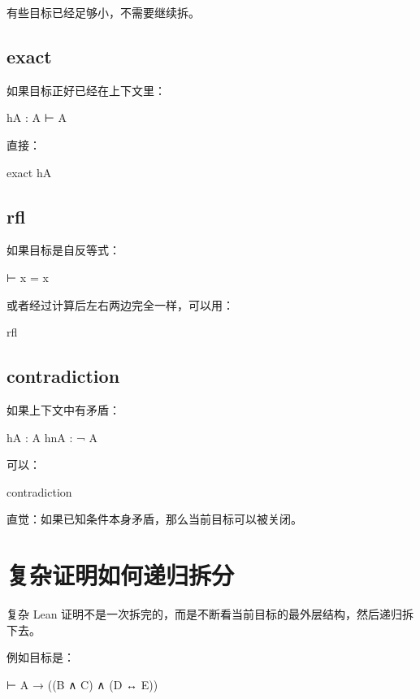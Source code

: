 \documentclass[UTF8,12pt]{ctexart}
\begin{document}
有些目标已经足够小，不需要继续拆。

\subsection{exact}

如果目标正好已经在上下文里：

\begin{LeanCode}
hA : A
⊢ A
\end{LeanCode}

直接：

\begin{LeanCode}
exact hA
\end{LeanCode}

\subsection{rfl}

如果目标是自反等式：

\begin{LeanCode}
⊢ x = x
\end{LeanCode}

或者经过计算后左右两边完全一样，可以用：

\begin{LeanCode}
rfl
\end{LeanCode}

\subsection{contradiction}

如果上下文中有矛盾：

\begin{LeanCode}
hA : A
hnA : ¬ A
\end{LeanCode}

可以：

\begin{LeanCode}
contradiction
\end{LeanCode}

直觉：如果已知条件本身矛盾，那么当前目标可以被关闭。

\section{复杂证明如何递归拆分}

复杂 Lean 证明不是一次拆完的，而是不断看当前目标的最外层结构，然后递归拆下去。

例如目标是：

\begin{LeanCode}
⊢ A → ((B ∧ C) ∧ (D ↔ E))
\end{LeanCode}
\end{document}
